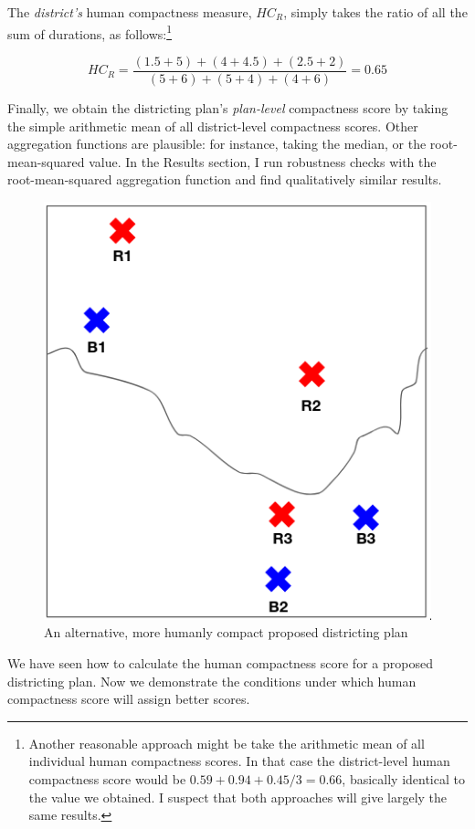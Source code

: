 \documentclass[]{article}
\begin{document}
The \emph{district's} human compactness measure, \(HC_R\), simply takes
the ratio of all the sum of durations, as follows:\footnote{Another
  reasonable approach might be take the arithmetic mean of all
  individual human compactness scores. In that case the district-level
  human compactness score would be \(0.59 + 0.94 + 0.45 / 3 = 0.66\),
  basically identical to the value we obtained. I suspect that both
  approaches will give largely the same results.}

\[HC_R = \frac{(1.5+5) + (4 + 4.5) + (2.5 + 2)}{(5+6) + (5+4) + (4+6)} =
0.65\]

Finally, we obtain the districting plan's \emph{plan-level} compactness
score by taking the simple arithmetic mean of all district-level
compactness scores. Other aggregation functions are plausible: for
instance, taking the median, or the root-mean-squared value. In the
Results section, I run robustness checks with the root-mean-squared
aggregation function and find qualitatively similar results.

\begin{figure}
\centering
\includegraphics{img/human_compactness_3.png}
\caption{An alternative, more humanly compact proposed districting plan
\label{hc_better}}
\end{figure}

We have seen how to calculate the human compactness score for a proposed
districting plan. Now we demonstrate the conditions under which human
compactness score will assign better scores.
\end{document}
